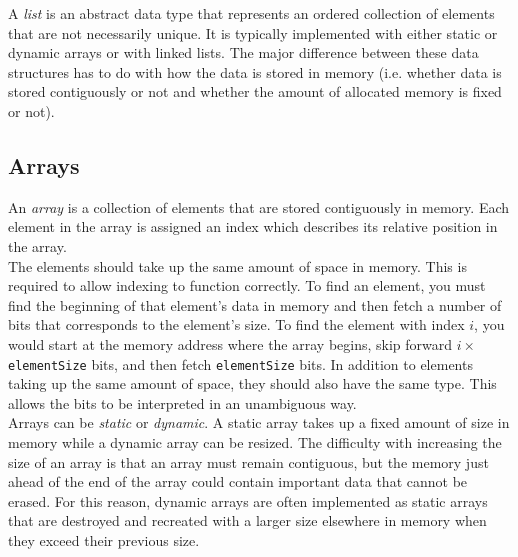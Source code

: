 A \textit{list} is an abstract data type that represents an ordered collection of elements that are not necessarily unique. It is typically implemented with either static or dynamic arrays or with linked lists. The major difference between these data structures has to do with how the data is stored in memory (i.e. whether data is stored contiguously or not and whether the amount of allocated memory is fixed or not).

\subsection{Arrays}

An \textit{array} is a collection of elements that are stored contiguously in memory. Each element in the array is assigned an index which describes its relative position in the array.\\

The elements should take up the same amount of space in memory. This is required to allow indexing to function correctly. To find an element, you must find the beginning of that element's data in memory and then fetch a number of bits that corresponds to the element's size. To find the element with index $i$, you would start at the memory address where the array begins, skip forward $i\times$\texttt{elementSize} bits, and then fetch \texttt{elementSize} bits. In addition to elements taking up the same amount of space, they should also have the same type. This allows the bits to be interpreted in an unambiguous way.\\

Arrays can be \textit{static} or \textit{dynamic}. A static array takes up a fixed amount of size in memory while a dynamic array can be resized. The difficulty with increasing the size of an array is that an array must remain contiguous, but the memory just ahead of the end of the array could contain important data that cannot be erased. For this reason, dynamic arrays are often implemented as static arrays that are destroyed and recreated with a larger size elsewhere in memory when they exceed their previous size.

